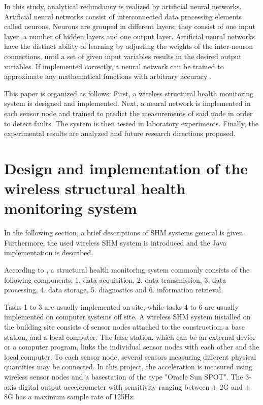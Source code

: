 \documentclass[12pt,a4paper]{scrartcl}
\begin{document}
In this study, analytical redundancy is realized by artificial neural networks.
Artificial neural networks consist of interconnected data processing elements called neurons. 
Neurons are grouped in different layers; they consist of one input layer, a number of hidden layers and one output layer.
Artificial neural networks have the distinct ability of learning by adjusting the weights of the inter-neuron connections, until a set of given input variables results in the desired output variables.
If implemented correctly, a neural network can be trained to approximate any mathematical functions with arbitrary accuracy \citep{Li2011}.

This paper is organized as follows:
First, a wireless structural health monitoring system is designed and implemented. 
Next, a neural network is implemented in each sensor node and trained to predict the measurements of said node in order to detect faults. 
The system is then tested in laboratory experiments. 
Finally, the experimental results are analyzed and future research directions proposed.


\newpage

\section*{Design and implementation of the wireless structural health monitoring system}
In the following section, a brief descriptions of SHM systems general is given. Furthermore, the used wireless SHM system is introduced and the Java implementation is described.

According to \cite[5]{BisbySHM}, a structural health monitoring system commonly consists of the following components:
1. data acquisition,
2. data transmission, 
3. data processing,
4. data storage,
5. diagnostics and 
6. information retrieval.

Tasks 1 to 3 are usually implemented on site, while tasks 4 to 6 are usually implemented on computer systems off site.
A wireless SHM system installed on the building site consists of sensor nodes attached to the construction, a base station, and a local computer. 
The base station, which can be an external device or a computer program, links the individual sensor nodes with each other and the local computer.
To each sensor node, several sensors measuring different physical quantities may be connected. 
In this project, the acceleration is measured using wireless sensor nodes and a basestation of the type "Oracle Sun SPOT". 
The 3-axis digital output accelerometer with sensitivity ranging between $ \pm $ 2G and $\pm$ 8G has a maximum sample rate of 125Hz. \cite[9]{eDemo2010}
\end{document}
